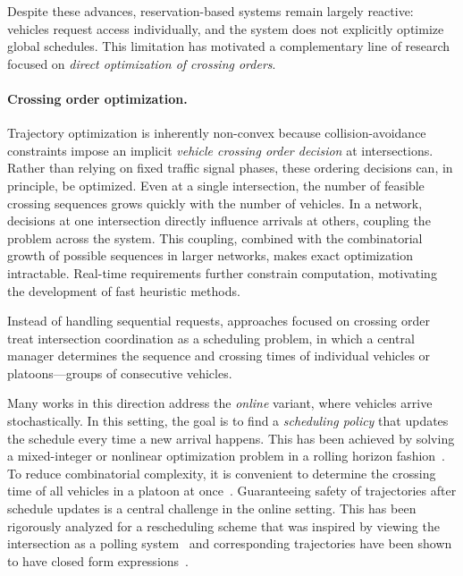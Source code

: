 \documentclass{report}
\theoremstyle{definition}
\theoremstyle{plain}
\begin{document}
Despite these advances, reservation-based systems remain largely reactive:
vehicles request access individually, and the system does not explicitly
optimize global schedules. This limitation has motivated a complementary line of
research focused on \emph{direct optimization of crossing orders}.

\paragraph{Crossing order optimization.}

Trajectory optimization is inherently non-convex because collision-avoidance
constraints impose an implicit \emph{vehicle crossing order decision} at
intersections. Rather than relying on fixed traffic signal phases, these
ordering decisions can, in principle, be optimized.
%
Even at a single intersection, the number of feasible crossing sequences grows
quickly with the number of vehicles. In a network, decisions at one intersection
directly influence arrivals at others, coupling the problem across the system.
This coupling, combined with the combinatorial growth of possible sequences
in larger networks, makes exact optimization intractable. Real-time requirements
further constrain computation, motivating the development of fast heuristic
methods.

Instead of handling sequential requests, approaches focused on crossing order
treat intersection coordination as a scheduling problem, in which a central
manager determines the sequence and crossing times of individual vehicles or
platoons---groups of consecutive vehicles.

Many works in this direction address the \emph{online} variant, where
vehicles arrive stochastically.
%
In this setting, the goal is to find a \emph{scheduling policy} that updates the
schedule every time a new arrival happens.
%
This has been achieved by solving a mixed-integer or nonlinear optimization
problem in a rolling horizon
fashion~\cite{levinConflictpointFormulationIntersection2017,liTemporalspatialDimensionExtensionbased2019}.
%
To reduce combinatorial complexity, it is convenient to determine the crossing
time of all vehicles in a platoon at
once~\cite{tallapragadaHierarchicaldistributedOptimizedCoordination2017,tallapragadaDistributedControlVehicle2017}.
%
Guaranteeing safety of trajectories
after schedule updates is a central challenge in the online setting.
%
This has been rigorously analyzed for a rescheduling scheme that was inspired by
viewing the intersection as a polling
system~\cite{miculescuPollingsystemsbasedAutonomousVehicle2016} and
corresponding trajectories have been shown to have closed form
expressions~\cite{timmermanPlatoonFormingAlgorithms2021}.
\end{document}

